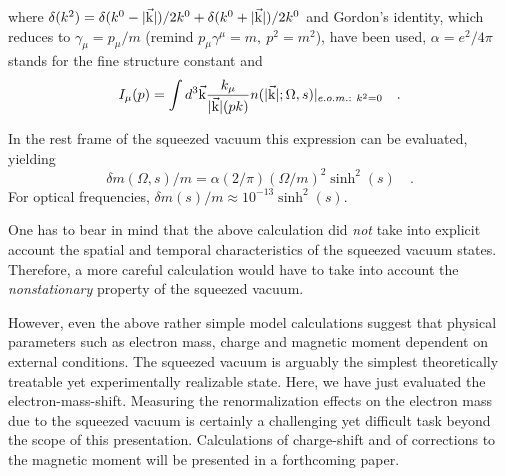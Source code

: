  where $\delta (k^2) = \delta(k^0-\vert \vec {\rm k}\vert)/2k^0 +
 \delta(k^0+\vert \vec {\rm k}\vert)/2k^0$ and
 Gordon's identity, which reduces to $\gamma_\mu =p_\mu /m$
 (remind $p_\mu \gamma^\mu = m,\ p^2 = m^2$), have been used,
 $\alpha =e^2/4\pi$ stands for the fine structure constant and
\begin{equation}
 I_\mu (p)=\int {d^3\vec {\rm k}}{k_\mu
 \over  \vert \vec  {\rm k}\vert (pk)}n(\vert \vec {\rm k}\vert ;\Omega
 ,s) \vert_{e.o.m.:\ k^2=0} \quad .
 \end{equation}

 In the rest frame of the squeezed vacuum
this expression can be  evaluated, yielding
\begin{equation}
{\delta m(\Omega ,s)/ m}= \alpha (2 / \pi)
(\Omega / m)^2\sinh^2(s)\quad .
\end{equation}
For optical frequencies, $\delta m(s)/m\approx 10^{-13}\sinh^2(s)$.

One has to bear in mind that the above calculation did {\em not} take
into explicit account the spatial and temporal characteristics of the squeezed
vacuum states. Therefore, a more careful
calculation would have to take into account the {\em nonstationary}
property of the squeezed vacuum.

However, even the above rather simple model calculations suggest
that physical parameters such as  electron mass, charge and magnetic moment
dependent on external conditions.
The squeezed vacuum is arguably the simplest theoretically treatable yet
experimentally realizable state.
Here, we have just
evaluated the electron-mass-shift.
Measuring the renormalization effects
on the electron mass due to the squeezed vacuum
is certainly a challenging yet difficult task beyond the scope of this presentation.
Calculations of charge-shift
and of corrections to the magnetic moment will be presented in a forthcoming paper.



